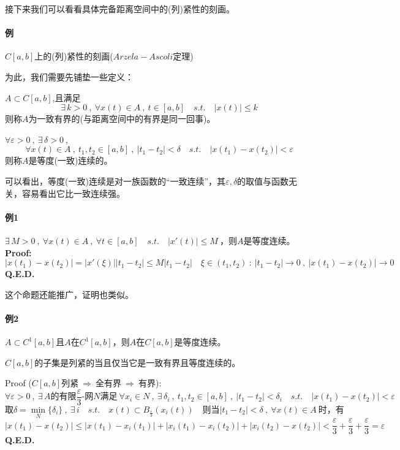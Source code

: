 接下来我们可以看看具体完备距离空间中的(列)紧性的刻画。

\paragraph*{例} \quad $C[a,b]$上的(列)紧性的刻画($Arzela-Ascoli$定理)

为此，我们需要先铺垫一些定义：
\begin{definition}[一致有界]
    $A \subset C[a,b]$,且满足
    \[\exists \, k>0 \ , \ \forall x(t) \in A \ , \ t \in [a,b] \quad s.t. \quad |x(t)| \leq k\]
    则称$A$为一致有界的(与距离空间中的有界是同一回事)。
\end{definition}
\begin{definition}[等度(一致)连续]
    $\forall \varepsilon>0 \ , \ \exists \, \delta>0 \ $,
    \[\forall x(t) \in A \ , \ t_1,t_2 \in [a,b] \ , \ |t_1-t_2|<\delta \quad s.t. \quad |x(t_1)-x(t_2)|<\varepsilon\]
    则称$A$是等度(一致)连续的。
\end{definition}
可以看出，等度(一致)连续是对一族函数的“一致连续”，其$\varepsilon,\delta$的取值与函数无关，容易看出它比一致连续强。

\paragraph*{例1} \quad $\exists \, M>0 \ , \ \forall x(t) \in A \ , \ \forall t \in [a,b] \quad s.t. \quad |x'(t)| \leq M \ $，则$A$是等度连续。\\
\textbf{Proof:}
\[|x(t_1)-x(t_2)|=|x'(\xi)||t_1-t_2| \leq M|t_1-t_2| \quad \xi \in (t_1,t_2) \ : \ |t_1-t_2| \to 0 \ , \ |x(t_1)-x(t_2)| \to 0\]
\textbf{Q.E.D.}

这个命题还能推广，证明也类似。

\paragraph*{例2} \quad $A \subset C^1[a,b]$且$A$在$C^1[a,b]$，则$A$在$C[a,b]$是等度连续。
\begin{theorem} \label{the:AA}
    $C[a,b]$的子集是列紧的当且仅当它是一致有界且等度连续的。
\end{theorem}
Proof ($C[a,b]$列紧$ \ \Rightarrow \ $全有界$ \ \Rightarrow \ $有界):
\[\forall \varepsilon>0 \ , \ \exists \, A\text{的有限}\frac{\varepsilon}{3}\text{-网}N\text{满足} \ \forall x_i \in N \ , \ \exists \,\delta_i \ , \ t_1,t_2 \in [a,b] \ , \ |t_1-t_2|<\delta_i \quad s.t. \quad |x(t_1)-x(t_2)|<\varepsilon\]
\[\text{取}\delta=\mathop \text{min}\limits_{N}\{\delta_i\} \ , \ \exists \, i \quad s.t. \quad x(t) \subset B_{\frac{\varepsilon}{3}}(x_i(t)) \quad \text{则当}|t_1-t_2|<\delta \ , \ \forall x(t) \in A \ \text{时，有}\]
\[|x(t_1)-x(t_2)| \leq |x(t_1)-x_i(t_1)|+|x_i(t_1)-x_i(t_2)|+|x_i(t_2)-x(t_2)|<\frac{\varepsilon}{3}+\frac{\varepsilon}{3}+\frac{\varepsilon}{3}=\varepsilon\]
\textbf{Q.E.D.}

